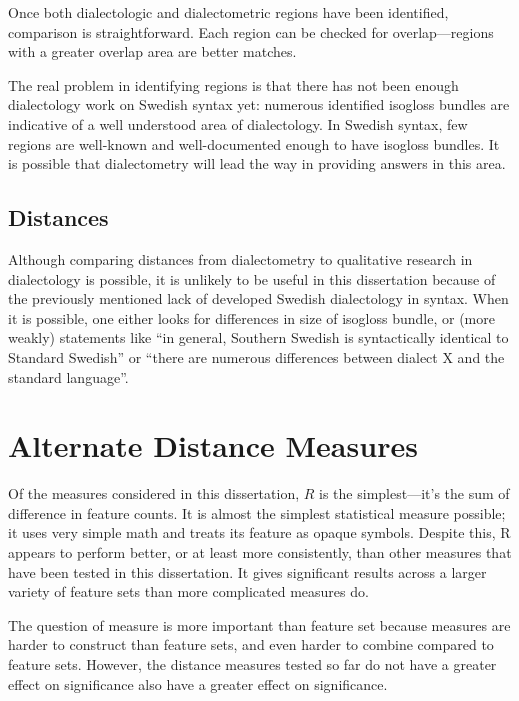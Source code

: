 Once both dialectologic and dialectometric regions have been
identified, comparison is straightforward. Each region can be checked
for overlap---regions with a greater overlap area are better matches.

The real problem in identifying regions is that there has not been
enough dialectology work on Swedish syntax yet: numerous identified
isogloss bundles are indicative of a well understood area of
dialectology. In Swedish syntax, few regions are well-known and
well-documented enough to have isogloss bundles. It is possible that
dialectometry will lead the way in providing answers in this
area.

\subsection{Distances}

Although comparing distances from dialectometry to qualitative
research in dialectology is possible, it is unlikely to be useful in
this dissertation because of the previously mentioned lack of
developed Swedish dialectology in syntax. When it is possible,
one either looks for differences in size of isogloss bundle, or (more
weakly) statements like ``in general, Southern
Swedish is syntactically identical to Standard Swedish''
\cite{rosenkvist07} or ``there are numerous differences between
dialect X and the standard language''.

\section{Alternate Distance Measures}

Of the measures considered in this dissertation, $R$ is the
simplest---it's the sum of difference in feature counts. It is almost
the simplest statistical measure possible; it uses very simple math
and treats its feature as opaque symbols.  Despite this, R appears to
perform better, or at least more consistently, than other measures
that have been tested in this dissertation. It gives significant
results across a larger variety of feature sets than more complicated
measures do.

The question of measure is more important than feature set because
measures are harder to construct than feature sets, and even harder to
combine compared to feature sets. However, the distance measures
tested so far do not have a greater effect on significance also have a
greater effect on significance.

